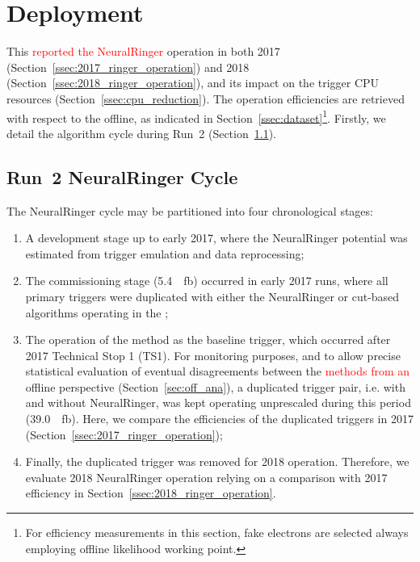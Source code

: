 \section{ Deployment}%
\label{sec:operation}



This \textcolor{red}{reported the NeuralRinger} operation in both 2017
(Section~\ref{ssec:2017_ringer_operation}) and 2018
(Section~\ref{ssec:2018_ringer_operation}), and its impact on the trigger
CPU resources (Section~\ref{ssec:cpu_reduction}). The operation efficiencies are
retrieved with respect to the offline, as indicated in
Section~\ref{ssec:dataset}\footnote{For efficiency measurements in this section,
fake electrons are selected always employing \veto\vloose{} offline likelihood
working point.}. Firstly, we detail the algorithm cycle during Run~2
(Section~\ref{ssec:run2_rnn_cycle}).

\subsection{Run~2 NeuralRinger Cycle}\label{ssec:run2_rnn_cycle}

The NeuralRinger cycle may be partitioned into four chronological stages:

\begin{enumerate}[i]
  \item A development stage up to early 2017, where the NeuralRinger
      potential was estimated from trigger emulation and data reprocessing;
  \item The commissioning stage (\SI{5.4}{\per\femto\barn}) occurred in
      early 2017 runs, where all primary
      triggers were duplicated with either the NeuralRinger or cut-based algorithms
      operating in the \fastcalo{};
  \item The operation of the method as the baseline trigger, which occurred after 2017 Technical Stop 1 (TS1). For
    monitoring purposes, and to allow precise statistical evaluation of eventual
    disagreements between the \fastcalo{} \textcolor{red}{methods from an} offline
    perspective (Section~\ref{sec:off_ana}), a duplicated trigger pair, i.e.
    with and without NeuralRinger, was kept operating unprescaled during this period
    (\SI{39.0}{\per\femto\barn}). Here, we compare the efficiencies of the
    duplicated triggers in 2017 (Section~\ref{ssec:2017_ringer_operation});
  \item Finally, the duplicated trigger was removed for 2018 operation.
    Therefore, we evaluate 2018 NeuralRinger operation relying on a comparison with
    2017 efficiency in Section~\ref{ssec:2018_ringer_operation}.
\end{enumerate}

